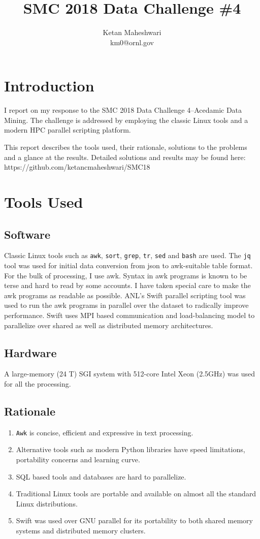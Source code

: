 \documentclass{report}
\title{SMC 2018 Data Challenge \#4}
\author{Ketan Maheshwari\\ km0@ornl.gov}
\begin{document}
\maketitle
\section*{Introduction}

I report on my response to the SMC 2018 Data Challenge 4--Acedamic Data Mining.
The challenge is addressed by employing the classic Linux tools and a modern HPC
parallel scripting platform.

This report describes the tools used, their rationale, solutions to the
problems and a glance at the results. Detailed solutions and results may be
found here: https://github.com/ketancmaheshwari/SMC18

\section*{Tools Used}
\subsection*{Software}
Classic Linux tools such as \texttt{awk}, \texttt{sort}, \texttt{grep},
\texttt{tr}, \texttt{sed} and \texttt{bash} are used.  The \texttt{jq} tool was
used for initial data conversion from json to awk-suitable table format. For
the bulk of processing, I use awk. Syntax in awk programs is known to be terse
and hard to read by some accounts. I have taken special care to make the awk
programs as readable as possible.  ANL's Swift parallel scripting tool was used
to run the awk programs in parallel over the dataset to radically improve
performance.  Swift uses MPI based communication and load-balancing model to
parallelize over shared as well as distributed memory architectures.

\subsection*{Hardware}
A large-memory (24 T) SGI system with 512-core Intel Xeon (2.5GHz) was used for
all the processing.

\subsection*{Rationale}
\begin{enumerate}
\item \texttt{Awk} is concise, efficient and expressive in text processing.
\item Alternative tools such as modern Python libraries have speed limitations, portability concerns and learning curve.
\item SQL based tools and databases are hard to parallelize.
\item Traditional Linux tools are portable and available on almost all the standard Linux distributions.
\item Swift was used over GNU parallel for its portability to both shared memory systems and distributed memory clusters.
\end{enumerate}
\end{document}
